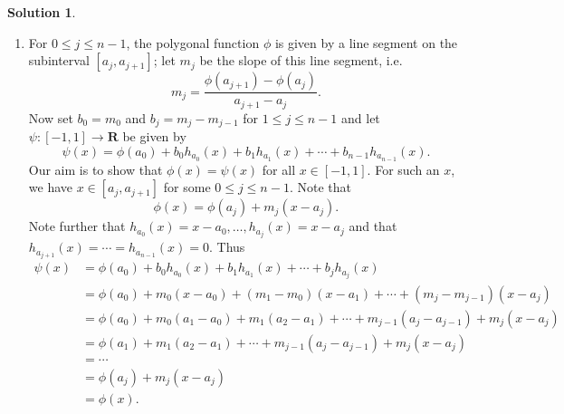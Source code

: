 \documentclass[12pt]{article}
\theoremstyle{definition}
\theoremstyle{exercise}
\theoremstyle{solution}
\newtheorem*{solution}{Solution}
\newcommand{\R}{\mathbf{R}}
\begin{document}
\begin{solution}
\begin{enumerate}
        \item For \( 0 \leq j \leq n - 1 \), the polygonal function \( \phi \) is given by a line segment on the subinterval \( [a_j, a_{j+1}] \); let \( m_j \) be the slope of this line segment, i.e.\
        \[
            m_j = \frac{\phi(a_{j+1}) - \phi(a_j)}{a_{j+1} - a_j}.  
        \]
        Now set \( b_0 = m_0 \) and \( b_j = m_j - m_{j-1} \) for \( 1 \leq j \leq n - 1 \) and let \( \psi : [-1, 1] \to \R \) be given by
        \[
            \psi(x) = \phi(a_0) + b_0 h_{a_0}(x) + b_1 h_{a_1}(x) + \cdots + b_{n-1} h_{a_{n-1}}(x).
        \]
        Our aim is to show that \( \phi(x) = \psi(x) \) for all \( x \in [-1, 1] \). For such an \( x \), we have \( x \in [a_j, a_{j+1}] \) for some \( 0 \leq j \leq n - 1 \). Note that
        \[
            \phi(x) = \phi(a_j) + m_j (x - a_j).
        \]
        Note further that \( h_{a_0}(x) = x - a_0, \ldots, h_{a_j}(x) = x - a_j \) and that \( h_{a_{j+1}}(x) = \cdots = h_{a_{n-1}}(x) = 0 \). Thus
        \begin{align*}
            \psi(x) &= \phi(a_0) + b_0 h_{a_0}(x) + b_1 h_{a_1}(x) + \cdots + b_j h_{a_j}(x) \\[2mm]
            &= \phi(a_0) + m_0 (x - a_0) + (m_1 - m_0)(x - a_1) + \cdots + (m_j - m_{j-1}) (x - a_j) \\[2mm]
            &= \phi(a_0) + m_0 (a_1 - a_0) + m_1 (a_2 - a_1) + \cdots + m_{j-1} (a_j - a_{j-1}) + m_j (x - a_j) \\[2mm]
            &= \phi(a_1) + m_1 (a_2 - a_1) + \cdots + m_{j-1} (a_j - a_{j-1}) + m_j (x - a_j) \\[2mm]
            &= \cdots \\[2mm]
            &= \phi(a_j) + m_j (x - a_j) \\[2mm]
            &= \phi(x).
        \end{align*}


\end{enumerate}
\end{solution}
\end{document}
